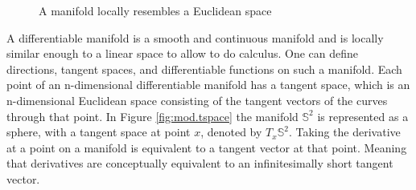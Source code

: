 \begin{figure}[h!]
	\centering
	\caption{A manifold locally resembles a Euclidean space\label{fig:mod.manifold}}
\end{figure}

A differentiable manifold is a smooth and continuous manifold and is locally similar enough to a linear space to allow to do calculus. One can define directions, tangent spaces, and differentiable functions on such a manifold. Each point of an n-dimensional differentiable manifold has a tangent space, which is an n-dimensional Euclidean space consisting of the tangent vectors of the curves through that point. In Figure \ref{fig:mod.tspace} the manifold $ \mathbb{S}^2 $ is represented as a sphere, with a tangent space at point $ x $, denoted by $ T_x\mathbb{S}^2 $. Taking the derivative at a point on a manifold is equivalent to a tangent vector at that point. Meaning that derivatives are conceptually equivalent to an infinitesimally short tangent vector. 
\begin{figure}[h!]
	\centering
	\caption{\label{fig:}}
\end{figure}		

